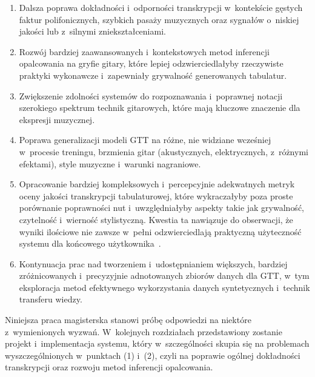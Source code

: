 \begin{enumerate}
    \item Dalsza poprawa dokładności i~odporności transkrypcji w~kontekście gęstych faktur polifonicznych, szybkich pasaży muzycznych oraz sygnałów o~niskiej jakości lub z~silnymi zniekształceniami.
    \item Rozwój bardziej zaawansowanych i~kontekstowych metod inferencji opalcowania na gryfie gitary, które lepiej odzwierciedlałyby rzeczywiste praktyki wykonawcze i~zapewniały grywalność generowanych tabulatur.
    \item Zwiększenie zdolności systemów do rozpoznawania i~poprawnej notacji szerokiego spektrum technik gitarowych, które mają kluczowe znaczenie dla ekspresji muzycznej.
    \item Poprawa generalizacji modeli GTT na różne, nie widziane wcześniej w~procesie treningu, brzmienia gitar (akustycznych, elektrycznych, z~różnymi efektami), style muzyczne i~warunki nagraniowe.
    \item Opracowanie bardziej kompleksowych i~percepcyjnie adekwatnych metryk oceny jakości transkrypcji tabulaturowej, które wykraczałyby poza proste porównanie poprawności nut i~uwzględniałyby aspekty takie jak grywalność, czytelność i~wierność stylistyczną. Kwestia ta nawiązuje do obserwacji, że wyniki ilościowe nie zawsze w~pełni odzwierciedlają praktyczną użyteczność systemu dla końcowego użytkownika~\autocite{Holzapfel2019Ethnomusicology}.
    \item Kontynuacja prac nad tworzeniem i~udostępnianiem większych, bardziej zróżnicowanych i~precyzyjnie adnotowanych zbiorów danych dla GTT, w~tym eksploracja metod efektywnego wykorzystania danych syntetycznych i~technik transferu wiedzy.
\end{enumerate}

Niniejsza praca magisterska stanowi próbę odpowiedzi na niektóre z~wymienionych wyzwań. W~kolejnych rozdziałach przedstawiony zostanie projekt i~implementacja systemu, który w~szczególności skupia się na problemach wyszczególnionych w~punktach (1) i~(2), czyli na poprawie ogólnej dokładności transkrypcji oraz rozwoju metod inferencji opalcowania.
